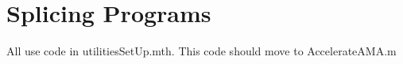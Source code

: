 \documentclass[12pt]{article}
\begin{document}











\section{Splicing Programs}
\label{sec:splicing-programs}

All use code in utilitiesSetUp.mth.  This code should move to AccelerateAMA.m
\end{document}
